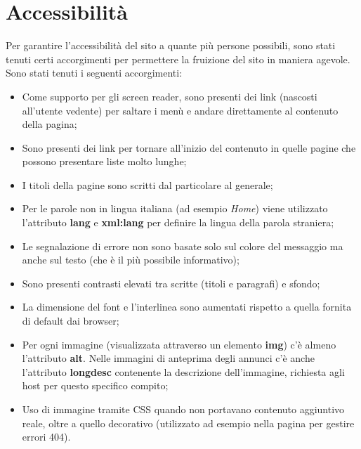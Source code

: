 \documentclass[1_relazione.tex]{subfiles}
\begin{document}
    \section{Accessibilit\`{a}}
    Per garantire l'accessibilità del sito a quante più persone possibili, sono stati tenuti certi accorgimenti per permettere la fruizione del sito in maniera agevole.
    Sono stati tenuti i seguenti accorgimenti:
    \begin{itemize}
        \item Come supporto per gli screen reader, sono presenti dei link (nascosti all'utente vedente) per saltare i men\`{u} e andare direttamente al contenuto della pagina;

        \item Sono presenti dei link per tornare all'inizio del contenuto in quelle pagine che possono presentare liste molto lunghe;

        \item I titoli della pagine sono scritti dal particolare al generale;

        \item Per le parole non in lingua italiana (ad esempio \textit{Home}) viene utilizzato l'attributo \textbf{lang} e \textbf{xml:lang} per definire la lingua della parola straniera;

        \item Le segnalazione di errore non sono basate solo sul colore del messaggio ma anche sul testo (che è il più possibile informativo);

        \item Sono presenti contrasti elevati tra scritte (titoli e paragrafi) e sfondo;

        \item La dimensione del font e l'interlinea sono aumentati rispetto a quella fornita di default dai browser;

        \item Per ogni immagine (visualizzata attraverso un elemento \textbf{img}) c'è almeno l'attributo \textbf{alt}.
        Nelle immagini di anteprima degli annunci c'è anche l'attributo \textbf{longdesc} contenente la descrizione dell'immagine, richiesta agli host per questo specifico compito;

        \item Uso di immagine tramite CSS quando non portavano contenuto aggiuntivo reale, oltre a quello decorativo (utilizzato ad esempio nella pagina per gestire errori 404).

    \end{itemize}
\end{document}
